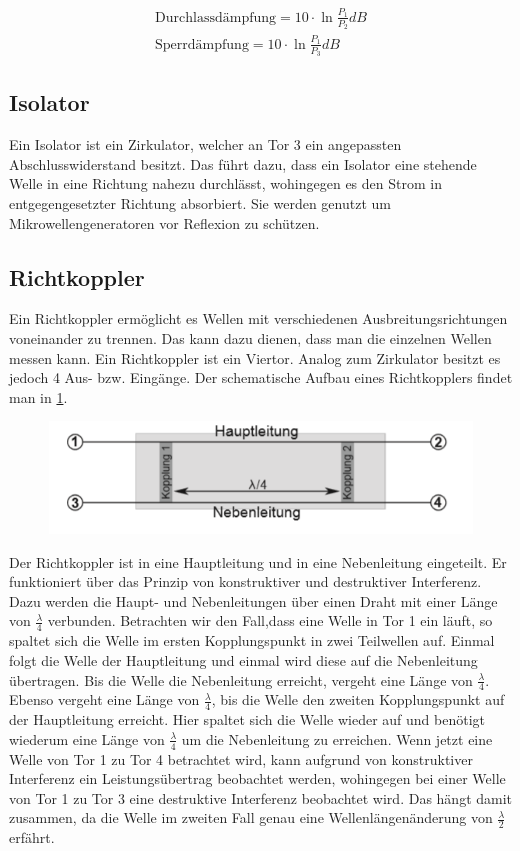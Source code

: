 \begin{align}
\text{Durchlassdämpfung} = 10 \cdot \ln{\frac{P_1}{P_2}}dB \\
\text{Sperrdämpfung} =  10 \cdot \ln{\frac{P_1}{P_3}}dB 
\end{align}

\subsection{Isolator}
Ein Isolator ist ein Zirkulator, welcher an Tor 3 ein angepassten Abschlusswiderstand besitzt. Das führt dazu, dass ein Isolator eine stehende Welle in eine Richtung nahezu durchlässt, wohingegen es den Strom in entgegengesetzter Richtung absorbiert. Sie werden genutzt um Mikrowellengeneratoren vor Reflexion zu schützen.

\subsection{Richtkoppler}
Ein Richtkoppler ermöglicht es Wellen mit verschiedenen Ausbreitungsrichtungen voneinander zu trennen. Das kann dazu dienen, dass man die einzelnen Wellen messen kann. Ein Richtkoppler ist ein Viertor. Analog zum Zirkulator besitzt es jedoch 4 Aus- bzw. Eingänge. Der schematische Aufbau eines Richtkopplers findet man in \cref{RB}. 
\begin{figure}[h!]
	\centering
	\includegraphics[scale = 1]{Richt-Bild.PNG}
	\caption{}
	\label{RB}
\end{figure}
Der Richtkoppler ist in eine Hauptleitung und in eine Nebenleitung eingeteilt. Er funktioniert über das Prinzip von konstruktiver und destruktiver Interferenz. Dazu werden die Haupt- und Nebenleitungen über einen Draht mit  einer Länge von $\frac{\lambda}{4}$ verbunden. Betrachten wir den Fall,dass eine Welle in Tor 1 ein läuft, so spaltet sich die Welle im ersten Kopplungspunkt in zwei Teilwellen auf. Einmal folgt die Welle der Hauptleitung und einmal wird diese auf die Nebenleitung übertragen. Bis die Welle die Nebenleitung erreicht, vergeht eine Länge von $\frac{\lambda}{4}$. Ebenso vergeht eine Länge von $\frac{\lambda}{4}$, bis die Welle den zweiten Kopplungspunkt auf der Hauptleitung erreicht. Hier spaltet sich die Welle wieder auf und benötigt wiederum eine Länge von $\frac{\lambda}{4}$ um die Nebenleitung zu erreichen. Wenn jetzt eine Welle von Tor 1 zu Tor 4 betrachtet wird, kann aufgrund von konstruktiver Interferenz ein Leistungsübertrag beobachtet werden, wohingegen bei einer Welle von Tor 1 zu Tor 3 eine destruktive Interferenz beobachtet wird. Das hängt damit zusammen, da die Welle im zweiten Fall genau eine Wellenlängenänderung von $\frac{\lambda}{2}$ erfährt.
